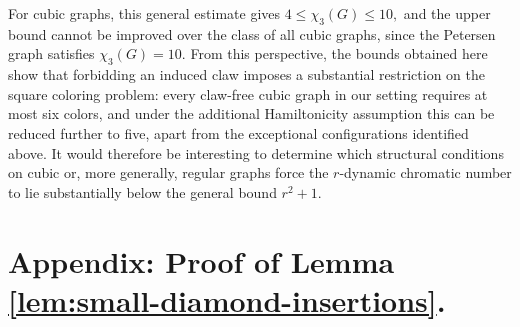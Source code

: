 \documentclass[10pt,a4paper]{article}
\newtheorem{lemma}     	[theorem] {Lemma}
\theoremstyle{case}
\numberwithin{subcase}{case}
\begin{document}
For cubic graphs, this general estimate gives
$
4\leq \chi_3(G)\leq 10,
$
and the upper bound cannot be improved over the class of all cubic graphs, since the Petersen graph satisfies \(\chi_3(G)=10\). From this perspective, the bounds obtained here show that forbidding an induced claw imposes a substantial restriction on the square coloring problem: every claw-free cubic graph in our setting requires at most six colors, and under the additional Hamiltonicity assumption this can be reduced further to five, apart from the exceptional configurations identified above.
It would therefore be interesting to determine which structural conditions on cubic or, more generally, regular graphs force the \(r\)-dynamic chromatic number to lie substantially below the general bound \(r^2+1\). 

\newpage
\section{Appendix: Proof of Lemma \ref{lem:small-diamond-insertions}.}


\end{document}

